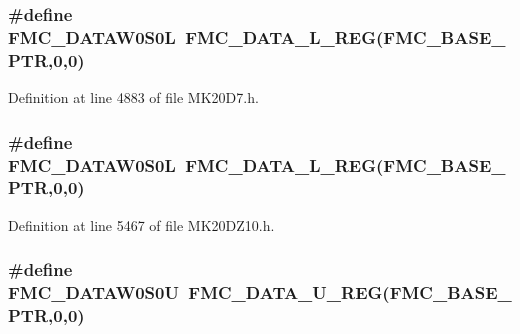 \subsubsection[{\texorpdfstring{F\+M\+C\+\_\+\+D\+A\+T\+A\+W0\+S0L}{FMC_DATAW0S0L}}]{\setlength{\rightskip}{0pt plus 5cm}\#define F\+M\+C\+\_\+\+D\+A\+T\+A\+W0\+S0L~{\bf F\+M\+C\+\_\+\+D\+A\+T\+A\+\_\+\+L\+\_\+\+R\+EG}({\bf F\+M\+C\+\_\+\+B\+A\+S\+E\+\_\+\+P\+TR},0,0)}\hypertarget{group___f_m_c___register___accessor___macros_gaa081e39991d4e898a56c459eda2c3676}{}\label{group___f_m_c___register___accessor___macros_gaa081e39991d4e898a56c459eda2c3676}


Definition at line 4883 of file M\+K20\+D7.\+h.

\subsubsection[{\texorpdfstring{F\+M\+C\+\_\+\+D\+A\+T\+A\+W0\+S0L}{FMC_DATAW0S0L}}]{\setlength{\rightskip}{0pt plus 5cm}\#define F\+M\+C\+\_\+\+D\+A\+T\+A\+W0\+S0L~{\bf F\+M\+C\+\_\+\+D\+A\+T\+A\+\_\+\+L\+\_\+\+R\+EG}({\bf F\+M\+C\+\_\+\+B\+A\+S\+E\+\_\+\+P\+TR},0,0)}\hypertarget{group___f_m_c___register___accessor___macros_gaa081e39991d4e898a56c459eda2c3676}{}\label{group___f_m_c___register___accessor___macros_gaa081e39991d4e898a56c459eda2c3676}


Definition at line 5467 of file M\+K20\+D\+Z10.\+h.

\subsubsection[{\texorpdfstring{F\+M\+C\+\_\+\+D\+A\+T\+A\+W0\+S0U}{FMC_DATAW0S0U}}]{\setlength{\rightskip}{0pt plus 5cm}\#define F\+M\+C\+\_\+\+D\+A\+T\+A\+W0\+S0U~{\bf F\+M\+C\+\_\+\+D\+A\+T\+A\+\_\+\+U\+\_\+\+R\+EG}({\bf F\+M\+C\+\_\+\+B\+A\+S\+E\+\_\+\+P\+TR},0,0)}\hypertarget{group___f_m_c___register___accessor___macros_ga7c5b3877003dd768343f89fd7558455e}{}\label{group___f_m_c___register___accessor___macros_ga7c5b3877003dd768343f89fd7558455e}


